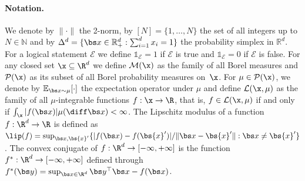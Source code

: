 \documentclass[11pt, a4paper, oneside, reqno]{article}
\begin{document}
	\paragraph{Notation.}
	We denote by $\|\cdot\|$ the 2-norm, by $[N] = \{1, \ldots, N \}$ the set of all integers up to $N\in\mathbb N$ and by $\Delta^d = \{\bs x \in \mathbb R_+^d : \sum_{i = 1}^d x_i =1\}$ the probability simplex in $\mathbb R^d$. 
	For a logical statement $\mathcal E$ we define $\mathds{1}_{\mathcal E} = 1$ if $\mathcal E$ is true and $\mathds{1}_{\mathcal E} = 0$ if $\mathcal E$ is false.
	For any closed set $\x\subseteq \R^d$ we define $\mathcal{M}(\x)$ as the family of all Borel measures and $\mathcal{P}(\x)$ as its subset of all Borel probability measures on~$\x$. 
	For $\mu\in\mathcal{P}(\x)$, we denote by $\mathbb{E}_{\bs x \sim \mu}[\cdot]$ the expectation operator under $\mu$ and define $\mathcal{L}(\x, \mu)$ as the family of all $\mu$-integrable functions $f:\x\rightarrow\R$, that is, $f \in \mathcal{L}(\x, \mu)$ if and only if $\int_{\x} |f(\bs x)| \mu(\diff \bs x)<\infty$. 
	The Lipschitz modulus of a function $f: \R^d \to \R$ is defined as $\lip(f) = \sup_{\bs x, \bs{x}'}\{|f(\bs x) - f(\bs{x}')|/\|\bs x - \bs{x}'\|: \bs x \neq \bs{x}'\}$. The convex conjugate of $f: \R^d \to [-\infty,+\infty]$ is the function $f^*:\R^d\rightarrow [-\infty,+\infty]$ defined through $f^{*}(\bs y) = \sup_{\bs x \in \R^d}\bs y^\top \bs x - f(\bs x)$. 
	
\end{document}
